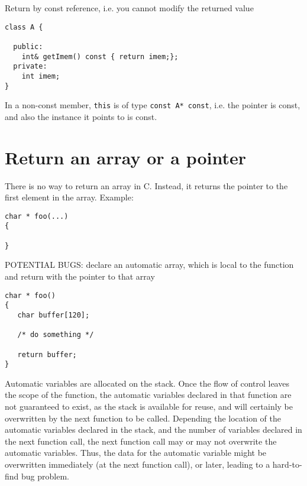 Return by const reference, i.e. you cannot modify the returned value
\begin{lstlisting}
class A {

  public:
    int& getImem() const { return imem;};
  private:
    int imem;
}
\end{lstlisting}
In a non-const member,  \verb!this! is of type \verb!const A* const!, i.e. the
pointer is const, and also the instance it points to is const.


\section{Return an array or a pointer}

There is no way to return an array in C. Instead, it returns the pointer to the
first element in the array. Example: 
\begin{verbatim}
char * foo(...)
{

}
\end{verbatim}

POTENTIAL BUGS: declare an automatic array, which is local to the function and
return with the pointer to that array
\begin{verbatim}
char * foo()
{
   char buffer[120];
   
   /* do something */
   
   return buffer;
}
\end{verbatim}
Automatic variables are allocated on the stack. Once the flow of control leaves
the scope of the function, the automatic variables declared in that function are
not guaranteed to exist, as the stack is available for reuse, and will
certainly be overwritten by the next function to be called. Depending the
location of the automatic variables declared in the stack, and the number of
variables declared in the next function call, the next function call may or may
not overwrite the automatic variables. Thus, the data for the automatic
variable might be overwritten immediately (at the next function call), or later,
leading to a hard-to-find bug problem.

